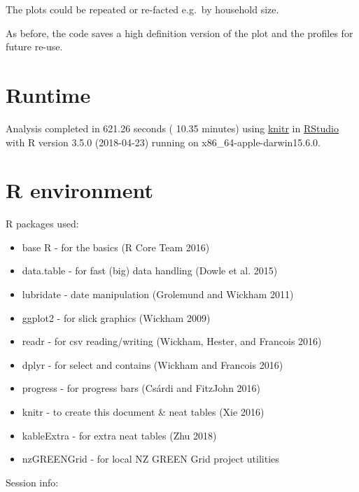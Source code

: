 \documentclass[]{article}
\providecommand{\tightlist}{%
  \setlength{\itemsep}{0pt}\setlength{\parskip}{0pt}}
\begin{document}
The plots could be repeated or re-facted e.g.~by household size.

As before, the code saves a high definition version of the plot and the
profiles for future re-use.

\section{Runtime}\label{runtime}

Analysis completed in 621.26 seconds ( 10.35 minutes) using
\href{https://cran.r-project.org/package=knitr}{knitr} in
\href{http://www.rstudio.com}{RStudio} with R version 3.5.0 (2018-04-23)
running on x86\_64-apple-darwin15.6.0.

\section{R environment}\label{r-environment}

R packages used:

\begin{itemize}
\tightlist
\item
  base R - for the basics (R Core Team 2016)
\item
  data.table - for fast (big) data handling (Dowle et al. 2015)
\item
  lubridate - date manipulation (Grolemund and Wickham 2011)
\item
  ggplot2 - for slick graphics (Wickham 2009)
\item
  readr - for csv reading/writing (Wickham, Hester, and Francois 2016)
\item
  dplyr - for select and contains (Wickham and Francois 2016)
\item
  progress - for progress bars (Csárdi and FitzJohn 2016)
\item
  knitr - to create this document \& neat tables (Xie 2016)
\item
  kableExtra - for extra neat tables (Zhu 2018)
\item
  nzGREENGrid - for local NZ GREEN Grid project utilities
\end{itemize}

Session info:
\end{document}
